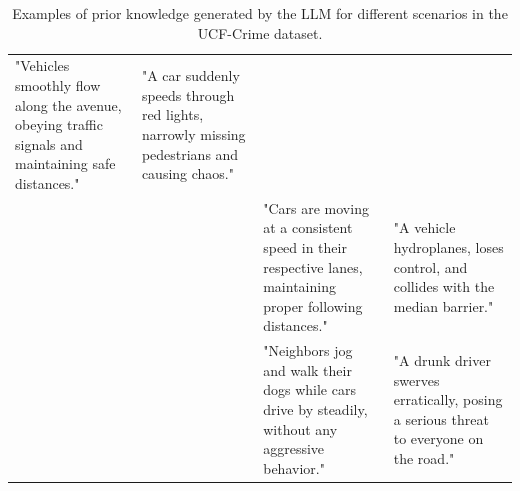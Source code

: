 \begin{table}[p]
\begin{tabularx}{\textwidth}{lXXX}
  "Vehicles smoothly flow along the avenue, obeying traffic signals and maintaining safe distances." &
  "A car suddenly speeds through red lights, narrowly missing pedestrians and causing chaos." \\
 &
   &
  "Cars are moving at a consistent speed in their respective lanes, maintaining proper following distances." &
  "A vehicle hydroplanes, loses control, and collides with the median barrier." \\
 &
   &
  "Neighbors jog and walk their dogs while cars drive by steadily, without any aggressive behavior." &
  "A drunk driver swerves erratically, posing a serious threat to everyone on the road." \\ \hline
\end{tabularx}
\caption{Examples of prior knowledge generated by the LLM for different scenarios in the UCF-Crime dataset.}
\label{tab:ucf-know}
\end{table}
